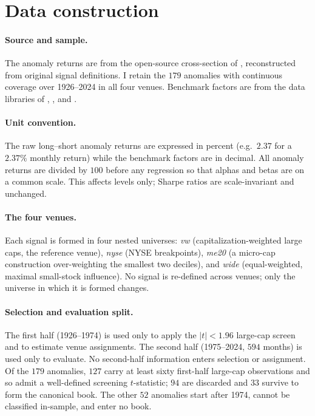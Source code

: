 \documentclass[12pt]{article}
\theoremstyle{plain}
\theoremstyle{definition}
\begin{document}
\section{Data construction}
\label{ia:data}

\paragraph{Source and sample.} The anomaly returns are from the open-source
cross-section of \citet{ChenZimmermann2022}, reconstructed from original signal
definitions. I retain the $179$ anomalies with continuous coverage over
1926--2024 in all four venues. Benchmark factors are from the data libraries of
\citet{FamaFrench2015}, \citet{Carhart1997}, and \citet{HouXueZhang2015}.

\paragraph{Unit convention.} The raw long--short anomaly returns are expressed in
percent (e.g.\ $2.37$ for a $2.37\%$ monthly return) while the benchmark factors
are in decimal. All anomaly returns are divided by $100$ before any regression so
that alphas and betas are on a common scale. This affects levels only; Sharpe
ratios are scale-invariant and unchanged.

\paragraph{The four venues.} Each signal is formed in four nested universes:
\emph{vw} (capitalization-weighted large caps, the reference venue), \emph{nyse}
(NYSE breakpoints), \emph{me20} (a micro-cap construction over-weighting the
smallest two deciles), and \emph{wide} (equal-weighted, maximal small-stock
influence). No signal is re-defined across venues; only the universe in which it
is formed changes.

\paragraph{Selection and evaluation split.} The first half (1926--1974) is used
only to apply the $|t|<1.96$ large-cap screen and to estimate venue assignments.
The second half (1975--2024, $594$ months) is used only to evaluate. No
second-half information enters selection or assignment. Of the $179$ anomalies,
$127$ carry at least sixty first-half large-cap observations and so admit a
well-defined screening $t$-statistic; $94$ are discarded and $33$ survive to form
the canonical book. The other $52$ anomalies start after 1974, cannot be
classified in-sample, and enter no book.
\end{document}
